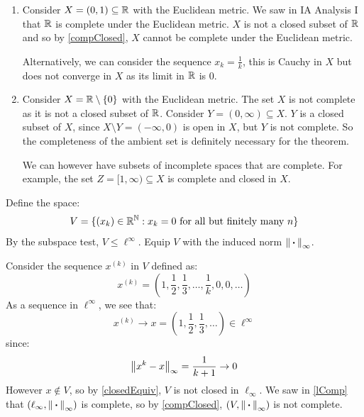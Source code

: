 \documentclass[../main.tex]{subfiles}
\begin{document}
\begin{example}
  \begin{enumerate}
    \item Consider $X = (0, 1) \subseteq \mathbb{R}$ with the Euclidean metric.
      We saw in IA Analysis I that $\mathbb{R}$ is complete under the Euclidean metric.
      $X$ is not a closed subset of $\mathbb{R}$ and so by \cref{compClosed}, $X$ cannot be complete under the Euclidean metric.

      Alternatively, we can consider the sequence $x_k = \frac{1}{k}$, this is Cauchy in $X$ but does not converge in $X$ as its limit in $\mathbb{R}$ is $0$.
    \item Consider $X = \mathbb{R} \setminus \{0\}$ with the Euclidean metric.
      The set $X$ is not complete as it is not a closed subset of $\mathbb{R}$.
      Consider $Y = (0, \infty) \subseteq X$.
      $Y$ is a closed subset of $X$, since $X \setminus Y = (-\infty, 0)$ is open in $X$, but $Y$ is not complete.
      So the completeness of the ambient set is definitely necessary for the theorem.

      We can however have subsets of incomplete spaces that are complete.
      For example, the set $Z = [1, \infty) \subseteq X$ is complete and closed in $X$.
  \end{enumerate}
\end{example}
\begin{example}
  Define the space:
  \[
    V = \{(x_k) \in \mathbb{R}^{\mathbb{N}}: x_k = 0 \text{ for all but finitely many $n$}\}
  \]
  By the subspace test, $V \leq \ell^{\infty}$.
  Equip $V$ with the induced norm $\left\lVert {\hspace{0.18em}\boldsymbol{\cdot}\hspace{0.18em}} \right\rVert_{\infty}$.

  Consider the sequence $x^{(k)}$ in $V$ defined as:
  \[
    x^{(k)} = \left(1, \frac{1}{2}, \frac{1}{3}, \ldots, \frac{1}{k}, 0, 0, \ldots\right)
  \]
  As a sequence in $\ell^{\infty}$, we see that:
  \[
    x^{(k)} \to x = \left(1, \frac{1}{2}, \frac{1}{3}, \ldots\right) \in \ell^{\infty}
  \]
  since:
  \[
    \left\lVert x^{k} - x \right\rVert_{\infty} = \frac{1}{k + 1} \to 0
  \]
  However $x \notin V$, so by \cref{closedEquiv}, $V$ is not closed in $\ell_{\infty}$.
  We saw in \cref{lComp} that $(\ell_{\infty}, \left\lVert {\hspace{0.18em}\boldsymbol{\cdot}\hspace{0.18em}} \right\rVert_{\infty})$ is complete, so by \cref{compClosed}, $(V, \left\lVert {\hspace{0.18em}\boldsymbol{\cdot}\hspace{0.18em}} \right\rVert_{\infty})$ is not complete.
\end{example}
\end{document}
